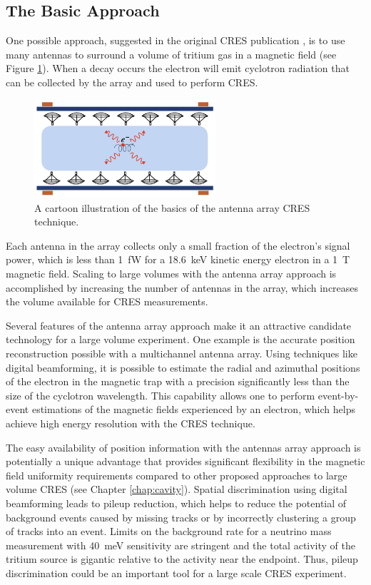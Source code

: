 \subsection{The Basic Approach}

One possible approach, suggested in the original CRES publication \cite{p8originalcres}, is to use many antennas to surround a volume of tritium gas in a magnetic field (see Figure \ref{fig:chap3-antenna-concept-cartoon}). When a decay occurs the electron will emit cyclotron radiation that can be collected by the array and used to perform CRES.
\begin{figure}[htbp]
    \centering
    \includegraphics*[width=0.6\textwidth]{figs/Chapter-3/230614_antenna_cartoon.png}
    \caption{\label{fig:chap3-antenna-concept-cartoon} A cartoon illustration of the basics of the antenna array CRES technique.}
\end{figure}
Each antenna in the array collects only a small fraction of the electron's signal power, which is less than 1~fW for a 18.6~keV kinetic energy electron in a 1~T magnetic field. Scaling to large volumes with the antenna array approach is accomplished by increasing the number of antennas in the array, which increases the volume available for CRES measurements. 

Several features of the antenna array approach make it an attractive candidate technology for a large volume experiment. One example is the accurate position reconstruction possible with a multichannel antenna array. Using techniques like digital beamforming, it is possible to estimate the radial and azimuthal positions of the electron in the magnetic trap with a precision significantly less than the size of the cyclotron wavelength. This capability allows one to perform event-by-event estimations of the magnetic fields experienced by an electron, which helps achieve high energy resolution with the CRES technique.

The easy availability of position information with the antennas array approach is potentially a unique advantage that provides significant flexibility in the magnetic field uniformity requirements compared to other proposed approaches to large volume CRES (see Chapter \ref{chap:cavity}). Spatial discrimination using digital beamforming leads to pileup reduction, which helps to reduce the potential of background events caused by missing tracks or by incorrectly clustering a group of tracks into an event. Limits on the background rate for a neutrino mass measurement with 40~meV sensitivity are stringent and the total activity of the tritium source is gigantic relative to the activity near the endpoint. Thus, pileup discrimination could be an important tool for a large scale CRES experiment.

